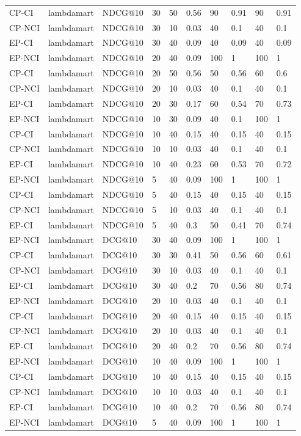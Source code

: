 \begin{landscape}
\begin{longtable}{|*{10}{l|}}
CP-CI&lambdamart&NDCG@10&30&50&0.56&90&0.91&90&0.91\\
CP-NCI&lambdamart&NDCG@10&30&10&0.03&40&0.1&40&0.1\\
EP-CI&lambdamart&NDCG@10&30&40&0.09&40&0.09&40&0.09\\
\hline
EP-NCI&lambdamart&NDCG@10&20&40&0.09&100&1&100&1\\
CP-CI&lambdamart&NDCG@10&20&50&0.56&50&0.56&60&0.6\\
CP-NCI&lambdamart&NDCG@10&20&10&0.03&40&0.1&40&0.1\\
EP-CI&lambdamart&NDCG@10&20&30&0.17&60&0.54&70&0.73\\
\hline
EP-NCI&lambdamart&NDCG@10&10&30&0.09&40&0.1&100&1\\
CP-CI&lambdamart&NDCG@10&10&40&0.15&40&0.15&40&0.15\\
CP-NCI&lambdamart&NDCG@10&10&10&0.03&40&0.1&40&0.1\\
EP-CI&lambdamart&NDCG@10&10&40&0.23&60&0.53&70&0.72\\
\hline
EP-NCI&lambdamart&NDCG@10&5&40&0.09&100&1&100&1\\
CP-CI&lambdamart&NDCG@10&5&40&0.15&40&0.15&40&0.15\\
CP-NCI&lambdamart&NDCG@10&5&10&0.03&40&0.1&40&0.1\\
EP-CI&lambdamart&NDCG@10&5&40&0.3&50&0.41&70&0.74\\
\hline
EP-NCI&lambdamart&DCG@10&30&40&0.09&100&1&100&1\\
CP-CI&lambdamart&DCG@10&30&30&0.41&50&0.56&60&0.61\\
CP-NCI&lambdamart&DCG@10&30&10&0.03&40&0.1&40&0.1\\
EP-CI&lambdamart&DCG@10&30&40&0.2&70&0.56&80&0.74\\
\hline
EP-NCI&lambdamart&DCG@10&20&10&0.03&40&0.1&40&0.1\\
CP-CI&lambdamart&DCG@10&20&40&0.15&40&0.15&40&0.15\\
CP-NCI&lambdamart&DCG@10&20&10&0.03&40&0.1&40&0.1\\
EP-CI&lambdamart&DCG@10&20&40&0.2&70&0.56&80&0.74\\
\hline
EP-NCI&lambdamart&DCG@10&10&40&0.09&100&1&100&1\\
CP-CI&lambdamart&DCG@10&10&40&0.15&40&0.15&40&0.15\\
CP-NCI&lambdamart&DCG@10&10&10&0.03&40&0.1&40&0.1\\
EP-CI&lambdamart&DCG@10&10&40&0.2&70&0.56&80&0.74\\
\hline
EP-NCI&lambdamart&DCG@10&5&40&0.09&100&1&100&1\\

\end{longtable}
\end{landscape}
